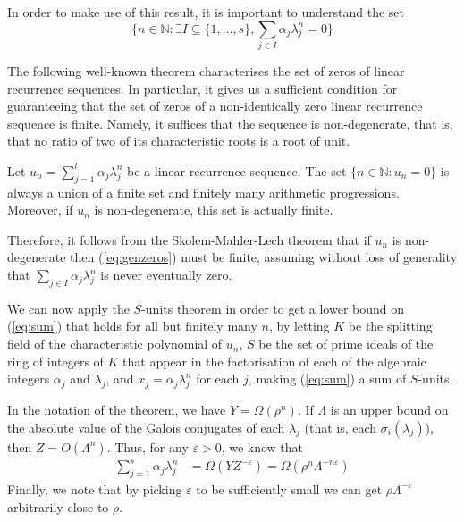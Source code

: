 In order to make use of this result, it is important to understand the set
\begin{equation}
\lbrace n\in\mathbb{N}: \exists I\subseteq \lbrace 1,\ldots,s\rbrace, \sum\limits_{j\in I}\alpha_j\lambda_j^n=0\rbrace
\label{eq:genzeros}
\end{equation}

The following well-known theorem characterises the set of zeros of
linear recurrence sequences. In particular, it gives us a sufficient
condition for guaranteeing that the set of zeros of a non-identically
zero linear recurrence sequence is finite. Namely, it suffices that the sequence is non-degenerate, that is, that no ratio of two of its characteristic roots is a root of unit.

\begin{theorem}
Let $u_n=\sum\limits_{j=1}^l \alpha_j\lambda_j^n$ be a linear recurrence sequence. The set $\lbrace n\in\mathbb{N}: u_n=0\rbrace$ is always a union of a finite set and finitely many arithmetic progressions. Moreover, if $u_n$ is non-degenerate, this set is actually finite.
\end{theorem}

Therefore, it follows from the Skolem-Mahler-Lech theorem that if $u_n$ is non-degenerate  then (\ref{eq:genzeros}) must be finite, assuming without loss of generality that $\sum\limits_{j\in I}\alpha_j\lambda_j^n$ is never eventually zero.

We can now apply the $S$-units theorem in order to get a lower bound on (\ref{eq:sum}) that holds for all but finitely many $n$, by letting $K$ be the splitting field of the characteristic polynomial of $u_n$, $S$ be the set of prime ideals of the ring of integers of $K$ that appear in the factorisation of each of the algebraic integers $\alpha_j$ and $\lambda_j$, and $x_j=\alpha_j\lambda_j^n$ for each $j$, making (\ref{eq:sum}) a sum of $S$-units.

In the notation of the theorem, we have $Y=\Omega(\rho^n)$. If $\Lambda$ is an upper bound on the absolute value of the Galois conjugates of each $\lambda_j$ (that is, each $\sigma_i(\lambda_j)$), then $Z=O(\Lambda^n)$. Thus, for any $\varepsilon>0$, we know that
\begin{align*}
\sum\limits_{j=1}^s\alpha_j\lambda_j^n &=\Omega(YZ^{-\varepsilon})=
\Omega\left(\rho^n\Lambda^{-n\varepsilon}\right)
\end{align*}
Finally, we note that by picking $\varepsilon$ to be sufficiently small we can get $\rho\Lambda^{-\varepsilon}$ arbitrarily close to $\rho$.

